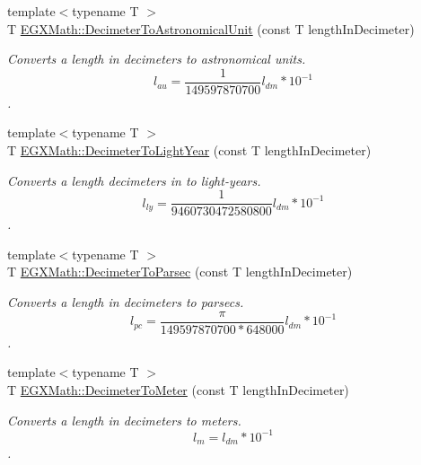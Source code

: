 \begin{DoxyCompactItemize}
\item 
{\footnotesize template$<$typename T $>$ }\\T \mbox{\hyperlink{group___e_g_x_math-_conversions-_length_conversions-_s_i-_decimeter-_astronomical_ga9cf39545f022d3a541668e644347b2f8}{E\+G\+X\+Math\+::\+Decimeter\+To\+Astronomical\+Unit}} (const T length\+In\+Decimeter)
\begin{DoxyCompactList}\small\item\em Converts a length in decimeters to astronomical units. \[ l_{au}= \frac{1}{149597870700} l_{dm} * 10^{-1} \]. \end{DoxyCompactList}\item 
{\footnotesize template$<$typename T $>$ }\\T \mbox{\hyperlink{group___e_g_x_math-_conversions-_length_conversions-_s_i-_decimeter-_astronomical_ga2dedea5304a0dbcba4efa1128eda42d2}{E\+G\+X\+Math\+::\+Decimeter\+To\+Light\+Year}} (const T length\+In\+Decimeter)
\begin{DoxyCompactList}\small\item\em Converts a length decimeters in to light-\/years. \[ l_{ly}= \frac{1}{9460730472580800} l_{dm} * 10^{-1} \]. \end{DoxyCompactList}\item 
{\footnotesize template$<$typename T $>$ }\\T \mbox{\hyperlink{group___e_g_x_math-_conversions-_length_conversions-_s_i-_decimeter-_astronomical_gad84954082a6648312ce4fc52d1e4d8eb}{E\+G\+X\+Math\+::\+Decimeter\+To\+Parsec}} (const T length\+In\+Decimeter)
\begin{DoxyCompactList}\small\item\em Converts a length in decimeters to parsecs. \[ l_{pc}=\frac{\pi}{149597870700 * 648000} l_{dm} * 10^{-1} \]. \end{DoxyCompactList}\item 
{\footnotesize template$<$typename T $>$ }\\T \mbox{\hyperlink{group___e_g_x_math-_conversions-_length_conversions-_s_i-_decimeter-_s_i_ga51fdff755420d79cc7c4cab051a1e820}{E\+G\+X\+Math\+::\+Decimeter\+To\+Meter}} (const T length\+In\+Decimeter)
\begin{DoxyCompactList}\small\item\em Converts a length in decimeters to meters. \[ l_{m}=l_{dm} * 10^{-1} \]. \end{DoxyCompactList}\item 

\end{DoxyCompactItemize}
